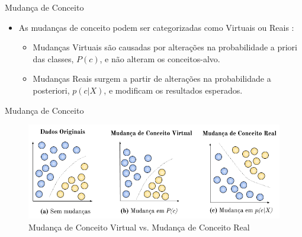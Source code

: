 \documentclass[10pt]{beamer}
\begin{document}
\begin{frame}{Mudança de Conceito}
    \begin{itemize}
        \item<1 -> As mudanças de conceito podem ser categorizadas como \alert{Virtuais} ou \alert{Reais} \cite{Gama:2014:SCD:2597757.2523813}:
        \begin{itemize}
        \item<2 -> \alert{Mudanças Virtuais} são causadas por alterações na probabilidade a priori das classes, $P(c)$, e não alteram os conceitos-alvo.
        \item<3 -> \alert{Mudanças Reais} surgem a partir de alterações na probabilidade a posteriori, $p(c|X)$, e modificam os resultados esperados.
        \end{itemize}
    \end{itemize}
\end{frame}

\begin{frame}{Mudança de Conceito}
\begin{figure}[H]
    \begin{center}
        \includegraphics[scale=0.5]{imagens/concept_drift.png}
        \caption{Mudança de Conceito Virtual vs. Mudança de Conceito Real}
        \label{fig:real_and_virtual_concept_drift}
    \end{center}
\end{figure}
\end{frame}
\end{document}
